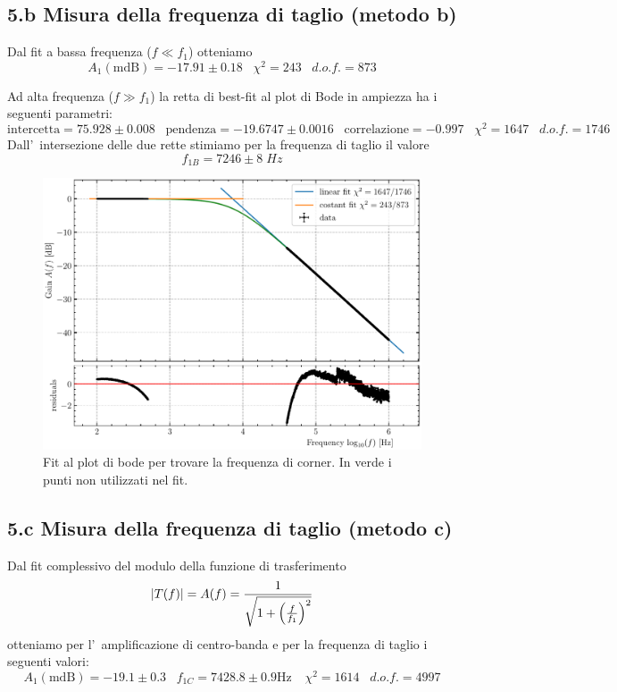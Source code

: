 \documentclass[10pt,a4paper]{article}
\begin{document}
\subsection*{5.b Misura della frequenza di taglio (metodo b)}
Dal fit a bassa frequenza ($f\ll f_1$) otteniamo
\[
A_1(\mathrm{mdB}) = -17.91 \pm 0.18 \;\;\; \chi^2 = 243 \;\;\; d.o.f. = 873
\]

Ad alta frequenza ($f \gg f_1$) la retta di best-fit al plot di Bode in 
ampiezza ha i seguenti parametri:
\[
\mathrm{intercetta} = 75.928 \pm 0.008 \;\;\;\mathrm{pendenza} = -19.6747 \pm 
0.0016 \;\;\;\mathrm{correlazione} 
= -0.997 \;\;\; \chi^2 = 1647 \;\;\; d.o.f. = 1746
\]
Dall'~intersezione delle due rette stimiamo per la frequenza di taglio il valore
\[
f_{1B} = 7246 \pm 8 \; \si{Hz}
\]

\begin{figure}[htbp]
\centering
\includegraphics[scale=0.7]{corner}
\caption{Fit al plot di bode per trovare la frequenza di corner. In verde i
punti non utilizzati nel fit. \label{fig: corner}}
\end{figure}

\subsection*{5.c Misura della frequenza di taglio (metodo c)}
Dal fit complessivo del modulo della funzione di trasferimento
\begin{equation}\label{eq: lpfgain}
\left| T(f) \right| = A(f) = \frac{1}{\sqrt{1 + \left(\frac{f}{f_1}\right)^2}}
\end{equation}
otteniamo per l'~amplificazione di centro-banda e per la frequenza di taglio i 
seguenti valori:
\[
A_1 (\mathrm{mdB}) = -19.1 \pm 0.3 \;\;\; f_{1C} = 7428.8 \pm 0.9 \si{\Hz}
\;\;\;\ \chi^2 = 1614 \;\;\; d.o.f.= 4997
\]
\end{document}

